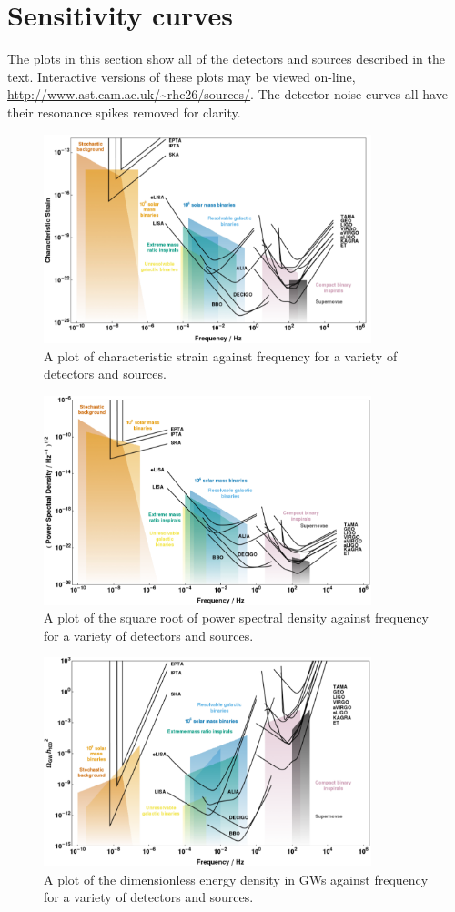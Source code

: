 \appendix
\section{Sensitivity curves}\label{app:a}
The plots in this section show all of the detectors and sources described in the text. Interactive versions of these plots may be viewed on-line, \url{http://www.ast.cam.ac.uk/~rhc26/sources/}. The detector noise curves all have their resonance spikes removed for clarity. 
\begin{figure}[h!]
 \centering
 \includegraphics[trim=0cm 0cm 0cm 0cm, width=0.85\textwidth]{figure1.pdf}
 \caption{A plot of characteristic strain against frequency for a variety of detectors and sources.}
 \label{fig:hc}
\end{figure}
\begin{figure}[h!]
 \centering
 \includegraphics[trim=0cm 0cm 0cm 0cm, width=0.85\textwidth]{figure2.pdf}
 \caption{A plot of the square root of power spectral density against frequency for a variety of detectors and sources.}
 \label{fig:S}
\end{figure}
\begin{figure}[h!]
 \centering
 \includegraphics[trim=0cm 0cm 0cm 0cm, width=0.85\textwidth]{figure3.pdf}
 \caption{A plot of the dimensionless energy density in GWs against frequency for a variety of detectors and sources.}
 \label{fig:omega}
\end{figure}

